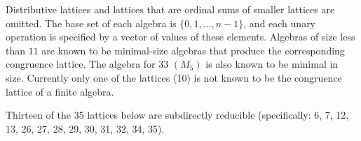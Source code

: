 
Distributive lattices and lattices that are ordinal sums of smaller lattices are omitted.
The base set of each algebra is $\{0,1,\dots,n-1\}$, and each unary operation is
specified by a vector of values of these elements.  Algebras of size less than
$11$ are known to be minimal-size algebras that produce the corresponding
congruence lattice. The algebra for 33 $(M_5)$ is also known to be minimal in
size. Currently only one of the lattices (10) is not known to be the congruence
lattice of a finite algebra. 

Thirteen of the 35 lattices below are subdirectly reducible (specifically: 6, 7,
12, 13, 26, 27, 28, 29, 30, 31, 32, 34, 35). 
\scriptsize


